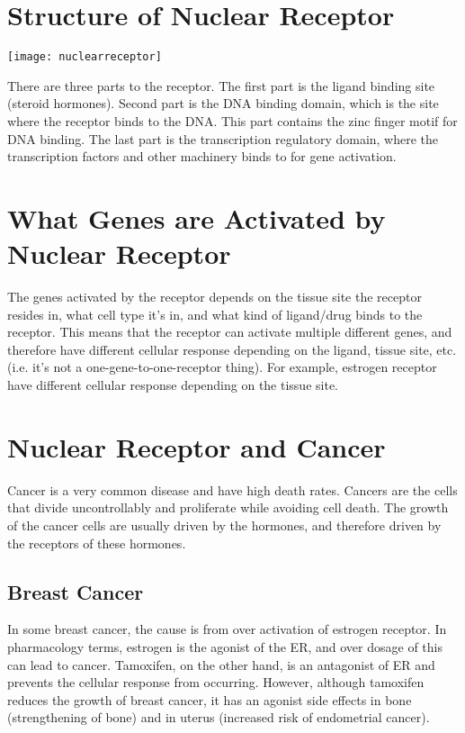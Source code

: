\section{Structure of Nuclear Receptor}

\begin{center}
\texttt{[image: nuclearreceptor]}
\end{center}

There are three parts to the receptor.
The first part is the ligand binding site (steroid hormones).
Second part is the DNA binding domain, which is the site where the receptor binds to the DNA.
This part contains the zinc finger motif for DNA binding.
The last part is the transcription regulatory domain, where the transcription factors and other machinery binds to for gene activation.

\section{What Genes are Activated by Nuclear Receptor}

The genes activated by the receptor depends on the tissue site the receptor resides in, what cell type it's in, and what kind of ligand/drug binds to the receptor.
This means that the receptor can activate multiple different genes, and therefore have different cellular response depending on the ligand, tissue site, etc. (i.e. it's not a one-gene-to-one-receptor thing).
For example, estrogen receptor have different cellular response depending on the tissue site.

\section{Nuclear Receptor and Cancer}

Cancer is a very common disease and have high death rates.
Cancers are the cells that divide uncontrollably and proliferate while avoiding cell death.
The growth of the cancer cells are usually driven by the hormones, and therefore driven by the receptors of these hormones.

\subsection{Breast Cancer}

In some breast cancer, the cause is from over activation of estrogen receptor.
In pharmacology terms, estrogen is the agonist of the ER, and over dosage of this can lead to cancer.
Tamoxifen, on the other hand, is an antagonist of ER and prevents the cellular response from occurring.
However, although tamoxifen reduces the growth of breast cancer, it has an agonist side effects in bone (strengthening of bone) and in uterus (increased risk of endometrial cancer).

